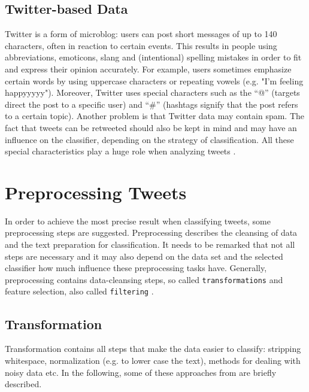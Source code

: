 \documentclass{acm_proc_article-sp}
\begin{document}
\subsection{Twitter-based Data} \label{twitter-based}

Twitter is a form of
microblog: users can post short messages of up to 140 characters, often in reaction
to certain events. This results
in people using abbreviations, emoticons, slang and (intentional) spelling
mistakes in order to fit and express their opinion accurately. For example, users
sometimes emphasize certain words by using uppercase characters or
repeating vowels (e.g. "I'm feeling happyyyyy"). Moreover, Twitter uses 
special characters such as the ``@'' (targets direct the post to a specific user)
and ``\#'' (hashtags signify that the post refers to a certain topic).
Another problem is that Twitter data may contain spam. The
fact that tweets can be retweeted should also be kept in mind and may have an
influence on the classifier, depending on the strategy of classification.  All
these special characteristics play a huge role when analyzing tweets
\cite{agarwal2011sentiment, read2005using}.


\section{Preprocessing Tweets} \label{preprocessing}

In order to achieve the
most precise result when classifying tweets, some preprocessing steps are
suggested. Preprocessing describes the cleansing of data and the text
preparation for classification. It needs to be remarked that not all steps are
necessary and it may also depend on the data set and the selected classifier
how much influence these preprocessing tasks have.  Generally, preprocessing
contains data-cleansing steps, so called \texttt{transformations} and feature
selection, also called \texttt{filtering} \cite{haddi2013therole}.


\subsection{Transformation}

Transformation contains all steps that make the
data easier to classify: stripping whitespace, normalization (e.g. to
lower case the text), methods for dealing with noisy data etc.  In the
following, some of these approaches from \cite{ting2011naive,
pak2010twitter,go2009twitter,agarwal2011sentiment,pang2008opinion,haddi2013therole}
are briefly described.
\end{document}

